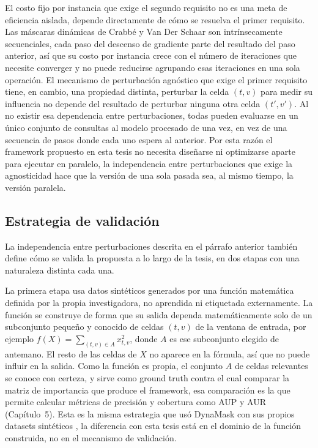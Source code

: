 El costo fijo por instancia que exige el segundo requisito no es una meta de eficiencia aislada, depende directamente de cómo se resuelva el primer requisito. Las máscaras dinámicas de Crabbé y Van Der Schaar \cite{crabbe2021} son intrínsecamente secuenciales, cada paso del descenso de gradiente parte del resultado del paso anterior, así que su costo por instancia crece con el número de iteraciones que necesite converger y no puede reducirse agrupando esas iteraciones en una sola operación. El mecanismo de perturbación agnóstico que exige el primer requisito tiene, en cambio, una propiedad distinta, perturbar la celda $(t,v)$ para medir su influencia no depende del resultado de perturbar ninguna otra celda $(t',v')$. Al no existir esa dependencia entre perturbaciones, todas pueden evaluarse en un único conjunto de consultas al modelo procesado de una vez, en vez de una secuencia de pasos donde cada uno espera al anterior. Por esta razón el framework propuesto en esta tesis no necesita diseñarse ni optimizarse aparte para ejecutar en paralelo, la independencia entre perturbaciones que exige la agnosticidad hace que la versión de una sola pasada sea, al mismo tiempo, la versión paralela.

\subsection{Estrategia de validación}
\label{sec:estrategia_validacion}

La independencia entre perturbaciones descrita en el párrafo anterior también define cómo se valida la propuesta a lo largo de la tesis, en dos etapas con una naturaleza distinta cada una.

La primera etapa usa datos sintéticos generados por una función matemática definida por la propia investigadora, no aprendida ni etiquetada externamente. La función se construye de forma que su salida dependa matemáticamente solo de un subconjunto pequeño y conocido de celdas $(t,v)$ de la ventana de entrada, por ejemplo $f(X) = \sum_{(t,v) \in A} x_{t,v}^2$, donde $A$ es ese subconjunto elegido de antemano. El resto de las celdas de $X$ no aparece en la fórmula, así que no puede influir en la salida. Como la función es propia, el conjunto $A$ de celdas relevantes se conoce con certeza, y sirve como ground truth contra el cual comparar la matriz de importancia que produce el framework, esa comparación es la que permite calcular métricas de precisión y cobertura como AUP y AUR (Capítulo~5). Esta es la misma estrategia que usó DynaMask con sus propios datasets sintéticos \cite{crabbe2021}, la diferencia con esta tesis está en el dominio de la función construida, no en el mecanismo de validación.

